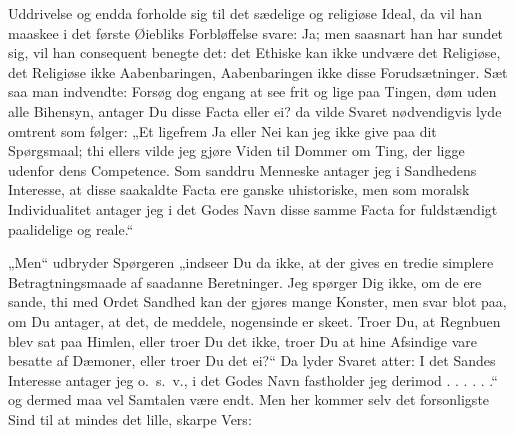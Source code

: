 Uddrivelse og endda forholde sig til det sædelige og religiøse Ideal, da vil han
maaskee i det første Øiebliks Forbløffelse svare: Ja; men saasnart han har
sundet sig, vil han consequent benegte det: det Ethiske kan ikke undvære det
Religiøse, det Religiøse ikke Aabenbaringen, Aabenbaringen ikke disse
Forudsætninger. Sæt saa man indvendte: Forsøg dog engang at see frit og lige
paa Tingen, døm uden alle Bihensyn, antager Du disse Facta eller ei? da vilde
Svaret nødvendigvis lyde omtrent som følger: „Et ligefrem Ja eller Nei kan jeg
ikke give paa dit Spørgsmaal; thi ellers vilde jeg gjøre Viden til Dommer om
Ting, der ligge udenfor dens Competence. Som sanddru Menneske antager jeg i
Sandhedens Interesse, at disse saakaldte Facta ere ganske uhistoriske, men som
moralsk Individualitet antager jeg i det Godes Navn disse samme Facta for
fuldstændigt paalidelige og reale.“

„Men“ udbryder Spørgeren „indseer Du da ikke, at der gives en tredie simplere
Betragtningsmaade af saadanne Beretninger. Jeg spørger Dig ikke, om de ere
sande, thi med Ordet Sandhed kan der gjøres mange Konster, men svar blot paa,
om Du antager, at det, de meddele, nogensinde er skeet. Troer Du, at Regnbuen
blev sat paa Himlen, eller troer Du det ikke, troer Du at hine Afsindige vare
besatte af Dæmoner, eller troer Du det ei?“ Da lyder Svaret atter:
I det Sandes Interesse antager jeg o.\ s.\ v., i det Godes Navn
fastholder jeg derimod . . . . . .“ og dermed maa vel Samtalen være endt. Men
her kommer selv det forsonligste Sind til at mindes det lille, skarpe Vers:

